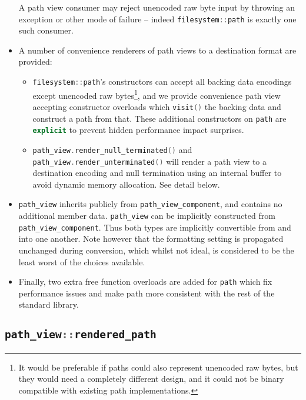 \documentclass[11pt]{article}
\newcommand{\code}[2][cpp]{\lstinline[language=#1,basicstyle=\small\ttfamily]{#2}}
\begin{document}
\begin{itemize}
    A path view consumer may reject unencoded raw byte input by throwing an exception or other mode of failure -- indeed \code{filesystem::path} is exactly one such consumer.
    \item A number of convenience renderers of path views to a destination format are provided:
    \begin{itemize}
        \item \code{filesystem::path}'s constructors can accept all backing data encodings except unencoded raw bytes\footnote{It would be preferable if paths could also represent unencoded raw bytes, but they would need a completely different design, and it could not be binary compatible with existing path implementations.}, and we provide convenience path view accepting constructor overloads which \code{visit()} the backing data and construct a path from that. These additional constructors on \code{path} are \code{explicit} to prevent hidden performance impact surprises.
        \item \code{path_view.render_null_terminated()} and  \code{path_view.render_unterminated()} will render a path view to a destination encoding and null termination using an internal buffer to avoid dynamic memory allocation. See detail below.
    \end{itemize}
    \item \code{path_view} inherits publicly from \code{path_view_component}, and contains no additional member data. \code{path_view} can be implicitly constructed from \code{path_view_component}. Thus both types are implicitly convertible from and into one another. Note however that the formatting setting is propagated unchanged during conversion, which whilst not ideal, is considered to be the least worst of the choices available.
    \item Finally, two extra free function overloads are added for \code{path} which fix performance issues and make path more consistent with the rest of the standard library.
\end{itemize}

\subsection{\code{path_view::rendered_path}}
\end{document}
